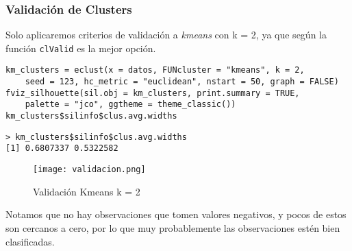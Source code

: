 \documentclass[b4paper]{article}
\begin{document}
    \subsubsection{Validaci\'on de Clusters}
    Solo aplicaremos criterios de validaci\'on a \textit{kmeans} con k = 2, ya que seg\'un 
    la funci\'on \verb|clValid| es la mejor opci\'on.
    \begin{tcolorbox}[title = input]
        \begin{verbatim}
km_clusters = eclust(x = datos, FUNcluster = "kmeans", k = 2,
    seed = 123, hc_metric = "euclidean", nstart = 50, graph = FALSE)
fviz_silhouette(sil.obj = km_clusters, print.summary = TRUE,
    palette = "jco", ggtheme = theme_classic())
km_clusters$silinfo$clus.avg.widths\end{verbatim}
    \end{tcolorbox}
    \begin{tcolorbox}[title = output]
        \begin{verbatim}
> km_clusters$silinfo$clus.avg.widths
[1] 0.6807337 0.5322582\end{verbatim}
    \end{tcolorbox}
    \newpage
    \begin{figure}[h]
        \centering
        \texttt{[image: validacion.png]}
        \caption{Validaci\'on Kmeans k = 2}
    \end{figure}
    Notamos que no hay observaciones que tomen valores negativos, y pocos de estos son cercanos a cero, por lo que muy probablemente las observaciones est\'en bien clasificadas.
\end{document}
